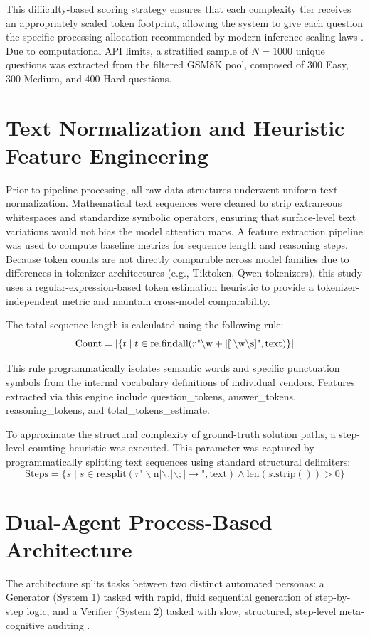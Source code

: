 \documentclass[12pt, a4paper, oneside]{report}
\begin{document}
This difficulty-based scoring strategy ensures that each complexity tier receives an appropriately scaled token footprint, allowing the system to give each question the specific processing allocation recommended by modern inference scaling laws \parencite{Snell2024, Zhou2026}. Due to computational API limits, a stratified sample of $N = 1000$ unique questions was extracted from the filtered GSM8K pool, composed of 300 Easy, 300 Medium, and 400 Hard questions.

\section{Text Normalization and Heuristic Feature Engineering}
Prior to pipeline processing, all raw data structures underwent uniform text normalization. Mathematical text sequences were cleaned to strip extraneous whitespaces and standardize symbolic operators, ensuring that surface-level text variations would not bias the model attention maps. A feature extraction pipeline was used to compute baseline metrics for sequence length and reasoning steps. Because token counts are not directly comparable across model families due to differences in tokenizer architectures (e.g., Tiktoken, Qwen tokenizers), this study uses a regular-expression-based token estimation heuristic to provide a tokenizer-independent metric and maintain cross-model comparability.

The total sequence length is calculated using the following rule:
$$\text{Count} = |\{t \mid t \in \text{re.findall}(r\text{"}\backslash\text{w}+|
[\mathrel{\hat{\mkern0mu}}\backslash\text{w}\backslash\text{s}]\text{"}, \text{text})\}|$$

This rule programmatically isolates semantic words and specific punctuation symbols
from the internal vocabulary definitions of individual vendors. Features extracted
via this engine include question\_tokens, answer\_tokens, reasoning\_tokens, and
total\_tokens\_estimate.

To approximate the structural complexity of ground-truth solution paths, a
step-level counting heuristic was executed. This parameter was captured by programmatically
splitting text sequences using standard structural delimiters:
$$\text{Steps} = \{s \mid s \in \text{re.split}(r\text{"}\backslash\text{n}|\backslash.|
\backslash;| \rightarrow\text{"}, \text{text}) \land \text{len}(s.\text{strip}()) > 0\}$$

\section{Dual-Agent Process-Based Architecture}
The architecture splits tasks between two distinct automated personas: 
a Generator (System 1) tasked with rapid, fluid sequential generation of step-by-step 
logic, and a Verifier (System 2) tasked with slow, structured, step-level meta-cognitive 
auditing \parencite{Zhang2025system2}.
\end{document}
